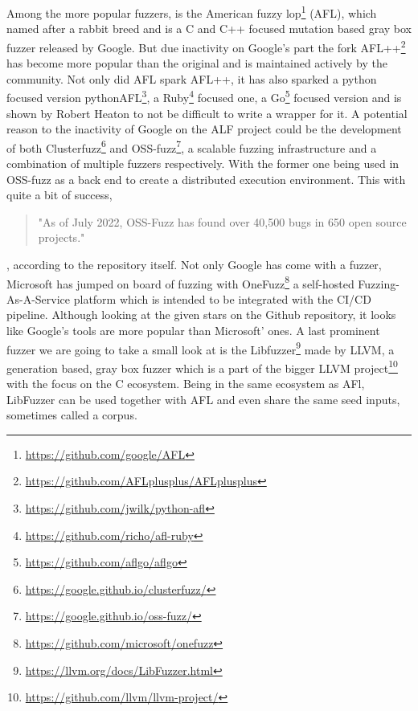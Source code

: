 Among the more popular fuzzers, is the American fuzzy lop\footnote{\url{https://github.com/google/AFL}} (AFL), which named after a rabbit breed and is a C and C++ focused mutation based gray box fuzzer released by Google. But due inactivity on Google's part the fork AFL++\cite{27AFL++}\footnote{\url{https://github.com/AFLplusplus/AFLplusplus}} has become more popular than the original and is maintained actively by the community. Not only did AFL spark AFL++, it has also sparked a python focused version pythonAFL\footnote{\url{https://github.com/jwilk/python-afl}}, a Ruby\footnote{\url{https://github.com/richo/afl-ruby}} focused one, a Go\footnote{\url{https://github.com/aflgo/aflgo}} focused version and is shown by Robert Heaton\cite{AFLWrapper} to not be difficult to write a wrapper for it. A potential reason to the inactivity of Google on the ALF project could be the development of both Clusterfuzz\footnote{\url{https://google.github.io/clusterfuzz/}} and OSS-fuzz\footnote{\url{https://google.github.io/oss-fuzz/}}, a scalable fuzzing infrastructure and a combination of multiple fuzzers respectively. With the former one being used in OSS-fuzz as a back end to create a distributed execution environment. This with quite a bit of success\cite{31OSS-FuzzBugs},
\begin{quote} 
	"As of July 2022, OSS-Fuzz has found over 40,500 bugs in 650 open source projects."
\end{quote}, according to the repository itself. 
Not only Google has come with a fuzzer, Microsoft has jumped on board of fuzzing with OneFuzz\footnote{\url{https://github.com/microsoft/onefuzz}} a self-hosted Fuzzing-As-A-Service platform which is intended to be integrated with the CI/CD pipeline. Although looking at the given stars on the Github repository, it looks like Google's tools are more popular than Microsoft' ones.
A last prominent fuzzer we are going to take a small look at is the Libfuzzer\footnote{\url{https://llvm.org/docs/LibFuzzer.html}} made by LLVM, a generation based, gray box fuzzer which is a part of the bigger LLVM project\footnote{\url{https://github.com/llvm/llvm-project/}} with the focus on the C ecosystem. Being in the same ecosystem as AFl, LibFuzzer can be used together with AFL and even share the same seed inputs, sometimes called a corpus.

